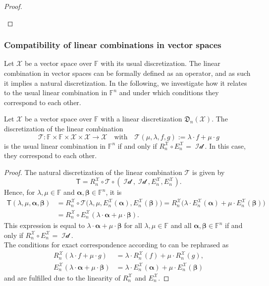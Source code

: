 \documentclass[a4paper]{paper}
\newcommand{\Discr}{\mathfrak{D}}
\newcommand{\Spc}[1]{\mathscr{#1}}
\newcommand{\Field}{\mathbb{F}}
\newcommand{\Op}[1]{\mathcal{#1}}
\newcommand{\DiscOp}[1]{\mathsf{#1}}
\newcommand*{\EXT}[2]{\ensuremath{E_{#1}^{#2}}}
\newcommand*{\REST}[2]{\ensuremath{R_{#1}^{#2}}}
\newcommand*{\RnX}{\ensuremath{\REST{n}{\Spc{X}}}}
\newcommand*{\EnX}{\ensuremath{\EXT{n}{\Spc{X}}}}
\DeclareMathOperator{\Id}{Id}
\newcommand{\valpha}{\boldsymbol{\alpha}}
\newcommand{\vbeta}{\boldsymbol{\beta}}
\begin{document}
\begin{proof}
\begin{enumerate}[a)]
 \end{enumerate}
\end{proof}



\subsubsection{Compatibility of linear combinations in vector spaces}

Let $\Spc{X}$ be a vector space over $\Field$ with its usual discretization. The linear combination in vector spaces 
can be formally defined as an operator, and as such it implies a natural discretization. In the following, we 
investigate how it relates to the usual linear combination in $\Field^n$ and under which conditions they correspond to 
each other.

\begin{lemma}
 Let $\Spc{X}$ be a vector space over $\Field$ with a linear discretization $\Discr_{n}(\Spc{X})$. The discretization 
of the 
 linear combination
 \begin{equation*}
  \Op{T} \colon \Field \times \Field \times \Spc{X} \times \Spc{X} \to \Spc{X}
  \quad \text{with} \quad
  \Op{T}(\mu, \lambda, f, g) := \lambda \cdot f + \mu \cdot g
 \end{equation*}
 is the usual linear combination in $\Field^n$ if and only if $\RnX \circ \EnX = \Op{\Id}$. In this case, they 
 correspond to each other.
\end{lemma}

\begin{proof}
 The natural discretization of the linear combination $\Op{T}$ is given by
 \begin{equation*}
  \DiscOp{T} = \RnX \circ \Op{T} \circ (\Op{\Id}, \Op{\Id}, \EnX, \EnX).
 \end{equation*}
 Hence, for $\lambda, \mu \in \Field$ and $\valpha, \vbeta \in \Field^n$, it is
 \begin{align*}
  \DiscOp{T}(\lambda, \mu, \valpha, \vbeta) 
  &= \RnX \circ \Op{T} \big( \lambda, \mu, \EnX(\valpha), \EnX(\vbeta) \big) 
  = \RnX \big( \lambda \cdot \EnX(\valpha) + \mu \cdot \EnX(\vbeta) \big) \\ 
  &= \RnX \circ \EnX(\lambda \cdot \valpha + \mu \cdot \vbeta).
 \end{align*}
 This expression is equal to $\lambda \cdot \valpha + \mu \cdot \vbeta$ for all $\lambda, \mu \in \Field$ and all 
 $\valpha, \vbeta \in \Field^n$ if and only if $\RnX \circ \EnX = \Op{\Id}$. \\
 The conditions for exact correspondence according to  can be rephrased as
 \begin{align*}
  \RnX(\lambda \cdot f + \mu \cdot g) &= \lambda \cdot \RnX(f) + \mu \cdot \RnX(g), \\
  \EnX(\lambda \cdot \valpha + \mu \cdot \vbeta) &= \lambda \cdot \EnX(\valpha) + \mu \cdot \EnX(\vbeta)
 \end{align*}
 and are fulfilled due to the linearity of $\RnX$ and $\EnX$.
\end{proof}
\end{document}
